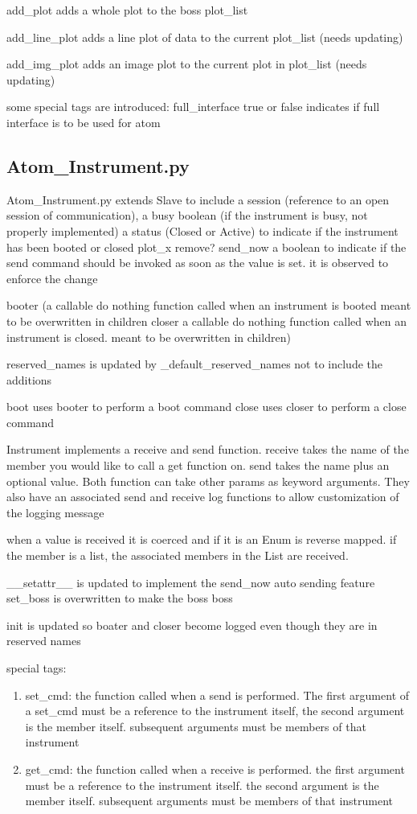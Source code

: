 \documentclass[12pt,a4paper]{article}
\begin{document}
{add\_plot} adds a whole plot to the boss plot\_list

{add\_line\_plot} adds a line plot of data to the current plot\_list (needs updating)

{add\_img\_plot} adds an image plot to the current plot in plot\_list (needs updating)

some special tags are introduced:
{full\_interface} true or false indicates if full interface is to be used for atom


\subsection{Atom\_Instrument.py}
{Atom\_Instrument.py} extends Slave to include a session (reference to an open session of communication), a busy boolean (if the instrument is busy, not properly implemented)
a status (Closed or Active) to indicate if the instrument has been booted or closed
{plot\_x} remove?
{send\_now} a boolean to indicate if the send command should be invoked as soon as the value is set. it is observed to enforce the change

booter (a callable do nothing function called when an instrument is booted meant to be overwritten in children
closer a callable do nothing function called when an instrument is closed. meant to be overwritten in children)

{reserved\_names} is updated by \_default\_reserved\_names not to include the additions

boot uses booter to perform a boot command
close uses closer to perform a close command

Instrument implements a receive and send function. receive takes the name of the member you would like to call a get function on. send takes the name plus an optional value. Both function can take other params as keyword arguments. They also have an associated send and receive log functions to allow customization of the logging message

when a value is received it is coerced and if it is an Enum is reverse mapped. if the member is a list, the associated members in the List are received.

{\_\_setattr\_\_} is updated to implement the send\_now auto sending feature
{set\_boss} is overwritten to make the boss boss

init is updated so boater and closer become logged even though they are in reserved names

special tags:
\begin{enumerate}
\item {set\_cmd}: the function called when a send is performed. The first argument of a set\_cmd must be a reference to the instrument itself, the second argument is the member itself. subsequent arguments must be members of that instrument
\item {get\_cmd}: the function called when a receive is performed. the first argument must be a reference to the instrument itself. the second argument is the member itself. subsequent arguments must be members of that instrument

\end{enumerate}
\end{document}
